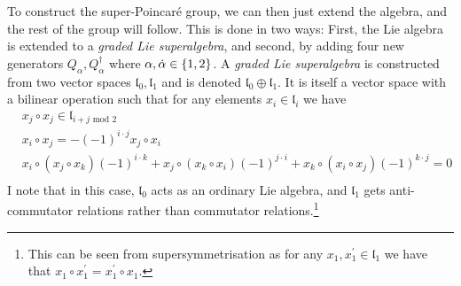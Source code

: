 \documentclass[../main.tex]{subfiles}
\begin{document}
To construct the super-Poincaré group, we can then just extend the algebra, and the rest of the group will follow.
This is done in two ways: First, the Lie algebra is extended to a \emph{graded Lie superalgebra}, and second, by adding four new generators \(Q_\alpha, Q^\dagger_{\dot{\alpha}}\) where \(\alpha, \dot{\alpha} \in \left\{1, 2\right\}\).
A \emph{graded Lie superalgebra} is constructed from two vector spaces \(\mathfrak{l}_0, \mathfrak{l}_1\) and is denoted \(\mathfrak{l}_0 \oplus \mathfrak{l}_1\).
It is itself a vector space with a bilinear operation such that for any elements \(x_i \in \mathfrak{l}_i\) we have
\begin{align}
   & x_j \circ x_j \in \mathfrak{l}_{i+j \text{ mod } 2} \tag{grading}                                                                     \\
  \label{susy:eq:supersymmetrisation}
   & x_i \circ x_j = -(-1)^{i\cdot j} x_j \circ x_i \tag{supersymmetrisation}                                                              \\
  \nonumber
   & x_i \circ (x_j \circ x_k) (-1)^{i\cdot k} + x_j \circ (x_k \circ x_i) (-1)^{j \cdot i} + x_k\circ (x_i \circ x_j) (-1)^{k\cdot j} = 0 \\
  \tag{generalised Jacobi identity}
\end{align}
I note that in this case, \(\mathfrak{l}_0\) acts as an ordinary Lie algebra, and \(\mathfrak{l}_1\) gets anti-commutator relations rather than commutator relations.\footnote{This can be seen from supersymmetrisation as for any \(x_1, x_1^\prime \in \mathfrak{l}_1\) we have that \(x_1 \circ x_1^\prime = x_1^\prime \circ x_1\).}
\end{document}

